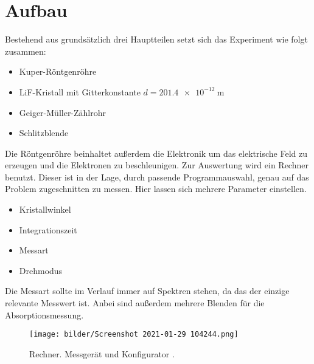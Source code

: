 \section{Aufbau}
Bestehend aus grundsätzlich drei Hauptteilen setzt sich das Experiment wie folgt zusammen:
\begin{itemize}
    \item{Kuper-Röntgenröhre}
     \item{LiF-Kristall mit Gitterkonstante $d = \SI{201.4e-12}{\meter}$}
     \item{Geiger-Müller-Zählrohr}
     \item{Schlitzblende}
\end{itemize}
Die Röntgenröhre beinhaltet außerdem die Elektronik um das elektrische Feld zu erzeugen und die Elektronen zu beschleunigen.
Zur Auswertung wird ein Rechner benutzt. Dieser ist in der Lage, durch passende Programmauswahl, genau auf das Problem zugeschnitten zu messen. 
Hier lassen sich mehrere Parameter einstellen. 
\begin{itemize}
     \item{Kristallwinkel}
     \item{Integrationszeit}
     \item{Messart}
     \item{Drehmodus}
\end{itemize}
Die Messart sollte im Verlauf immer auf Spektren stehen, da das der einzige relevante Messwert ist. Anbei sind außerdem mehrere Blenden für die Absorptionsmessung.

\begin{figure}
    \centering
    \texttt{[image: bilder/Screenshot 2021-01-29 104244.png]}
    \caption{Rechner. Messgerät und Konfigurator \cite{skript}. } 
    \label{fig:Rechner}
\end{figure}